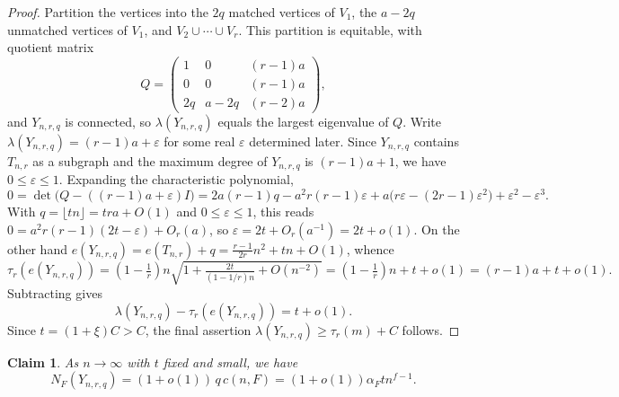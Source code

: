 \documentclass[11pt,a4paper]{article}
\newtheorem{claim}[theorem]{Claim}
\theoremstyle{definition}
\theoremstyle{plain}
\renewcommand{\le}{\leqslant}
\renewcommand{\ge}{\geqslant}
\begin{document}
\begin{proof}
Partition the vertices into the $2q$ matched vertices of $V_1$, the $a-2q$ unmatched vertices of $V_1$, and $V_2\cup\cdots\cup V_r$.  This partition is equitable, with quotient matrix
\[
  Q=
  \begin{pmatrix}
    1 & 0 & (r-1)a \\
    0 & 0 & (r-1)a \\
    2q & a-2q & (r-2)a
  \end{pmatrix},
\]
and $Y_{n,r,q}$ is connected, so $\lambda(Y_{n,r,q})$ equals the largest eigenvalue of $Q$.  Write $\lambda(Y_{n,r,q})=(r-1)a+\varepsilon$ for some real $\varepsilon$ determined later. 
Since $Y_{n,r,q}$ contains $T_{n,r}$ as a subgraph and 
 the maximum degree of $Y_{n,r,q}$ is $(r-1)a+1$, we have $0\le\varepsilon\le1$.  Expanding the characteristic polynomial,
\[
  0=\det\!\big(Q-((r-1)a+\varepsilon)I\big)
  =2a(r-1)q-a^2r(r-1)\varepsilon+a\big(r\varepsilon-(2r-1)\varepsilon^2\big)+\varepsilon^2-\varepsilon^3.
\]
With $q=\lfloor tn\rfloor=tra+O(1)$ and $0\le\varepsilon\le1$, this reads $0=a^2r(r-1)(2t-\varepsilon)+O_r(a)$, so $\varepsilon=2t+O_r(a^{-1})=2t+o(1)$.  On the other hand $e(Y_{n,r,q})=e(T_{n,r})+q=\tfrac{r-1}{2r}n^2+tn+O(1)$, whence
\[
  \tau_r(e(Y_{n,r,q}))
  =(1-\tfrac1r)n\sqrt{1+\tfrac{2t}{(1-1/r)n}+O(n^{-2})}
  =(1-\tfrac1r)n+t+o(1)=(r-1)a+t+o(1).
\]
Subtracting gives 
$$\lambda(Y_{n,r,q})-\tau_r(e(Y_{n,r,q}))=t+o(1).$$  
Since $t=(1+\xi)C>C$, 
 the final assertion $\lambda (Y_{n,r,q}) \ge \tau_r(m) +C$ follows.
\end{proof}

\begin{claim} \label{clm:matching-count}
As $n\to\infty$ with $t$ fixed and small,  we have 
$$ N_F (Y_{n,r,q})=(1+o(1))\,q\,c(n,F)=(1+o(1))\alpha_F t n^{f-1}.$$
\end{claim}
\end{document}
